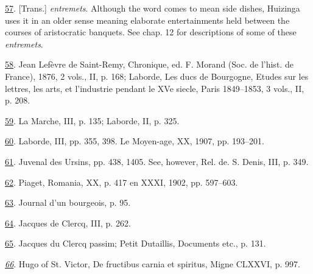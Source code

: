 \protect\hypertarget{23_NOTES.xhtmlux5cux23id_2118}{\protect\hyperlink{08_Chapter_One__THE_PASSIONATE_INTE.xhtmlux5cux23id_2117}{57}}.
{[}Trans.{]} \emph{entremets}. Although the word comes to mean side
dishes, Huizinga uses it in an older sense meaning elaborate
entertainments held between the courses of aristocratic banquets. See
chap. 12 for descriptions of some of these \emph{entremets}.

\protect\hypertarget{23_NOTES.xhtmlux5cux23id_2116}{\protect\hyperlink{08_Chapter_One__THE_PASSIONATE_INTE.xhtmlux5cux23id_2115}{58}}.
Jean Lefèvre de Saint-Remy, Chronique, ed. F. Morand (Soc. de l'hist. de
France), 1876, 2 vols., II, p. 168; Laborde, Les ducs de Bourgogne,
Etudes sur les lettres, les arts, et l'industrie pendant le XVe siecle,
Paris 1849--1853, 3 vols., II, p. 208.

\protect\hypertarget{23_NOTES.xhtmlux5cux23id_2114}{\protect\hyperlink{08_Chapter_One__THE_PASSIONATE_INTE.xhtmlux5cux23id_2113}{59}}.
La Marche, III, p. 135; Laborde, II, p. 325.

\protect\hypertarget{23_NOTES.xhtmlux5cux23id_2112}{\protect\hyperlink{08_Chapter_One__THE_PASSIONATE_INTE.xhtmlux5cux23id_2111}{60}}.
Laborde, III, pp. 355, 398. Le Moyen-age, XX, 1907, pp. 193--201.

\protect\hypertarget{23_NOTES.xhtmlux5cux23id_2110}{\protect\hyperlink{08_Chapter_One__THE_PASSIONATE_INTE.xhtmlux5cux23id_2109}{61}}.
Juvenal des Ursins, pp. 438, 1405. See, however, Rel. de. S. Denis, III,
p. 349.

\protect\hypertarget{23_NOTES.xhtmlux5cux23id_2108}{\protect\hyperlink{08_Chapter_One__THE_PASSIONATE_INTE.xhtmlux5cux23id_2107}{62}}.
Piaget, Romania, XX, p. 417 en XXXI, 1902, pp. 597--603.

\protect\hypertarget{23_NOTES.xhtmlux5cux23id_2106}{\protect\hyperlink{08_Chapter_One__THE_PASSIONATE_INTE.xhtmlux5cux23id_2105}{63}}.
Journal d'un bourgeois, p. 95.

\protect\hypertarget{23_NOTES.xhtmlux5cux23id_2104}{\protect\hyperlink{08_Chapter_One__THE_PASSIONATE_INTE.xhtmlux5cux23id_2103}{64}}.
Jacques de Clercq, III, p. 262.

\protect\hypertarget{23_NOTES.xhtmlux5cux23page_401}{\protect\hyperlink{08_Chapter_One__THE_PASSIONATE_INTE.xhtmlux5cux23id_2102}{65}}.
Jacques du Clercq passim; Petit Dutaillis, Documents etc., p. 131.

\emph{\protect\hypertarget{23_NOTES.xhtmlux5cux23id_2101}{\protect\hyperlink{08_Chapter_One__THE_PASSIONATE_INTE.xhtmlux5cux23id_2100}{66}}}.
Hugo of St. Victor, De fructibus carnia et spiritus, Migne CLXXVI, p.
997.


